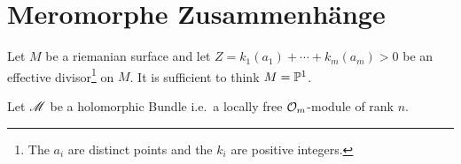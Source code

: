 \chapter{Meromorphe Zusammenhänge}
\begin{comment}
  Siehe:
  \begin{itemize}
    \item \cite{boalch} and \cite{thboalch}
    \item \cite{sabbah2007isomonodromic}
  \end{itemize}
  and
  \begin{itemize}
    \item \cite{Varadarajan96linearmeromorphic}
  \end{itemize}
\end{comment}

Let $M$ be a riemanian surface and let $Z=k_1(a_1)+\cdots+k_m(a_m)>0$ be an
effective divisor\footnote{The $a_i$ are distinct points and the $k_i$ are
positive integers.} on $M$.
It is sufficient to think $M=\P^1$.

Let $\sM$ be a holomorphic Bundle i.e.\ a locally free $\cO_m$-module of rank
$n$.

